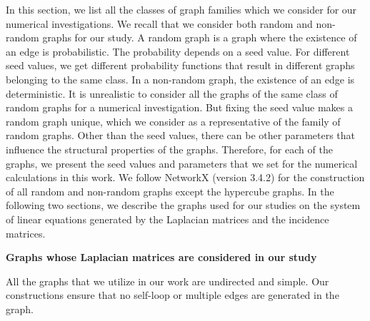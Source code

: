 \documentclass[%
 reprint,
 superscriptaddress,
 amsmath,amssymb,
 aps,
 pra,
floatfix,
nofootinbib,
]{revtex4-2}
\theoremstyle{definition}
\theoremstyle{remark}
\newcommand{\appsubsection}[1]{%
  \refstepcounter{subsection}%
  \bigskip
  \noindent\textbf{\thesubsection\quad #1}\par
  \smallskip
}
\begin{document}
\begin{appendix}
In this section, we list all the classes of graph families which we consider for our numerical investigations. We recall that we consider both random and non-random graphs for our study. A random graph is a graph where the existence of an edge is probabilistic. The probability depends on a seed value. For different seed values, we get different probability functions that result in different graphs belonging to the same class. In a non-random graph, the existence of an edge is deterministic. It is unrealistic to consider all the graphs of the same class of random graphs for a numerical investigation. But fixing the seed value makes a random graph unique, which we consider as a representative of the family of random graphs. Other than the seed values, there can be other parameters that influence the structural properties of the graphs. Therefore, for each of the graphs, we present the seed values and parameters that we set for the numerical calculations in this work. We follow NetworkX (version 3.4.2) for the construction of all random and non-random graphs except the hypercube graphs. In the following two sections, we describe the graphs used for our studies on the system of linear equations generated by the Laplacian matrices and the incidence matrices. 

\appsubsection{Graphs whose Laplacian matrices are considered in our study} 

    All the graphs that we utilize in our work are undirected and simple. Our constructions ensure that no self-loop or multiple edges are generated in the graph. 

\end{appendix}
\end{document}

